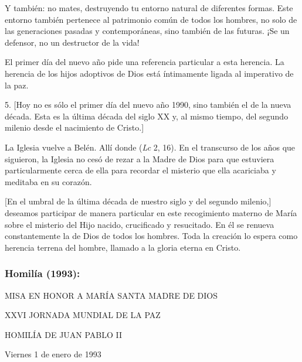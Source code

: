 \begin{body}
	Y también: no mates, destruyendo tu entorno natural de diferentes formas. Este entorno también pertenece al patrimonio común de todos los hombres, no solo de las generaciones pasadas y contemporáneas, sino también de las futuras. ¡Se un defensor, no un destructor de la vida!
	
	El primer día del nuevo año pide una referencia particular a esta herencia. La herencia de los hijos adoptivos de Dios está íntimamente ligada al imperativo de la paz.
	
	5. {[}Hoy no es sólo el primer día del nuevo año 1990, sino también el de la nueva década. Esta es la última década del siglo XX y, al mismo tiempo, del segundo milenio desde el nacimiento de Cristo.{]}
	
	La Iglesia vuelve a Belén. Allí donde  (\emph{Lc} 2, 16). En el transcurso de los años que siguieron, la Iglesia no cesó de rezar a la Madre de Dios para que estuviera particularmente cerca de ella para recordar el misterio que ella acariciaba y meditaba en su corazón.
	
	{[}En el umbral de la última década de nuestro siglo y del segundo milenio,{]} deseamos participar de manera particular en este recogimiento materno de María sobre el misterio del Hijo nacido, crucificado y resucitado. En él se renueva constantemente la  de Dios de todos los hombres. Toda la creación lo espera como herencia terrena del hombre, llamado a la gloria eterna en Cristo.
	
	\subsubsection{Homilía (1993): } MISA EN HONOR A MARÍA SANTA MADRE DE DIOS
	
	XXVI JORNADA MUNDIAL DE LA PAZ
	
	HOMILÍA DE JUAN PABLO II
	
	Viernes 1 de enero de 1993
	

\end{body}
